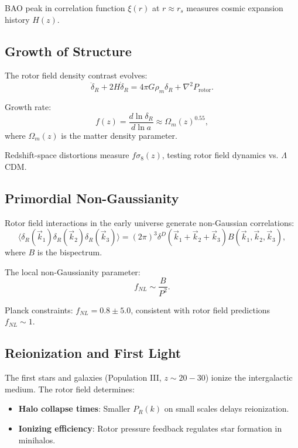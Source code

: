 \documentclass[12pt,a4paper]{article}
\theoremstyle{definition}
\theoremstyle{remark}
\begin{document}
BAO peak in correlation function $\xi(r)$ at $r \approx r_s$ measures cosmic expansion history $H(z)$.

\subsection{Growth of Structure}

The rotor field density contrast evolves:
\begin{equation}
\ddot{\delta}_R + 2H \dot{\delta}_R = 4\pi G \rho_m \delta_R + \nabla^2 P_{\text{rotor}}.
\end{equation}

Growth rate:
\begin{equation}
f(z) = \frac{d \ln \delta_R}{d \ln a} \approx \Omega_m(z)^{0.55},
\end{equation}
where $\Omega_m(z)$ is the matter density parameter.

Redshift-space distortions measure $f\sigma_8(z)$, testing rotor field dynamics vs. $\Lambda$CDM.

\subsection{Primordial Non-Gaussianity}

Rotor field interactions in the early universe generate non-Gaussian correlations:
\begin{equation}
\langle \delta_R(\vec{k}_1) \delta_R(\vec{k}_2) \delta_R(\vec{k}_3) \rangle = (2\pi)^3 \delta^D(\vec{k}_1 + \vec{k}_2 + \vec{k}_3) B(\vec{k}_1, \vec{k}_2, \vec{k}_3),
\end{equation}
where $B$ is the bispectrum.

The local non-Gaussianity parameter:
\begin{equation}
f_{NL} \sim \frac{B}{P^2}.
\end{equation}

Planck constraints: $f_{NL} = 0.8 \pm 5.0$, consistent with rotor field predictions $f_{NL} \sim 1$.

\subsection{Reionization and First Light}

The first stars and galaxies (Population III, $z \sim 20-30$) ionize the intergalactic medium. The rotor field determines:
\begin{itemize}
\item \textbf{Halo collapse times}: Smaller $P_R(k)$ on small scales delays reionization.
\item \textbf{Ionizing efficiency}: Rotor pressure feedback regulates star formation in minihalos.
\end{itemize}
\end{document}
